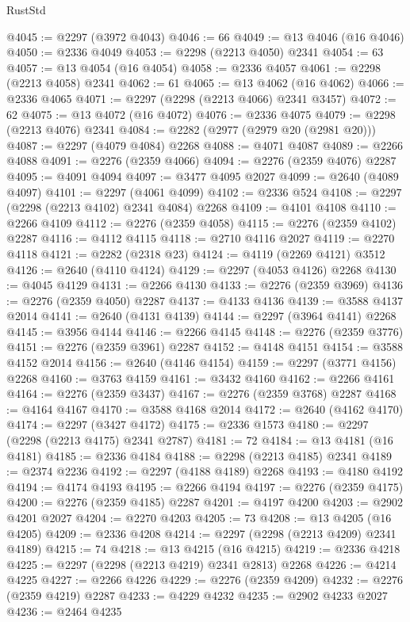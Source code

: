 \begin{lexlean}{RustStd}
\begin{coremodule}
@4045 := @2297 (@3972 @4043)
@4046 := 66
@4049 := @13 @4046 (@16 @4046)
@4050 := @2336 @4049
@4053 := @2298 (@2213 @4050) @2341
@4054 := 63
@4057 := @13 @4054 (@16 @4054)
@4058 := @2336 @4057
@4061 := @2298 (@2213 @4058) @2341
@4062 := 61
@4065 := @13 @4062 (@16 @4062)
@4066 := @2336 @4065
@4071 := @2297 (@2298 (@2213 @4066) @2341 @3457)
@4072 := 62
@4075 := @13 @4072 (@16 @4072)
@4076 := @2336 @4075
@4079 := @2298 (@2213 @4076) @2341
@4084 := @2282 (@2977 (@2979 @20 (@2981 @20)))
@4087 := @2297 (@4079 @4084) @2268
@4088 := @4071 @4087
@4089 := @2266 @4088
@4091 := @2276 (@2359 @4066)
@4094 := @2276 (@2359 @4076) @2287
@4095 := @4091 @4094
@4097 := @3477 @4095 @2027
@4099 := @2640 (@4089 @4097)
@4101 := @2297 (@4061 @4099)
@4102 := @2336 @524
@4108 := @2297 (@2298 (@2213 @4102) @2341 @4084) @2268
@4109 := @4101 @4108
@4110 := @2266 @4109
@4112 := @2276 (@2359 @4058)
@4115 := @2276 (@2359 @4102) @2287
@4116 := @4112 @4115
@4118 := @2710 @4116 @2027
@4119 := @2270 @4118
@4121 := @2282 (@2318 @23)
@4124 := @4119 (@2269 @4121) @3512
@4126 := @2640 (@4110 @4124)
@4129 := @2297 (@4053 @4126) @2268
@4130 := @4045 @4129
@4131 := @2266 @4130
@4133 := @2276 (@2359 @3969)
@4136 := @2276 (@2359 @4050) @2287
@4137 := @4133 @4136
@4139 := @3588 @4137 @2014
@4141 := @2640 (@4131 @4139)
@4144 := @2297 (@3964 @4141) @2268
@4145 := @3956 @4144
@4146 := @2266 @4145
@4148 := @2276 (@2359 @3776)
@4151 := @2276 (@2359 @3961) @2287
@4152 := @4148 @4151
@4154 := @3588 @4152 @2014
@4156 := @2640 (@4146 @4154)
@4159 := @2297 (@3771 @4156) @2268
@4160 := @3763 @4159
@4161 := @3432 @4160
@4162 := @2266 @4161
@4164 := @2276 (@2359 @3437)
@4167 := @2276 (@2359 @3768) @2287
@4168 := @4164 @4167
@4170 := @3588 @4168 @2014
@4172 := @2640 (@4162 @4170)
@4174 := @2297 (@3427 @4172)
@4175 := @2336 @1573
@4180 := @2297 (@2298 (@2213 @4175) @2341 @2787)
@4181 := 72
@4184 := @13 @4181 (@16 @4181)
@4185 := @2336 @4184
@4188 := @2298 (@2213 @4185) @2341
@4189 := @2374 @2236
@4192 := @2297 (@4188 @4189) @2268
@4193 := @4180 @4192
@4194 := @4174 @4193
@4195 := @2266 @4194
@4197 := @2276 (@2359 @4175)
@4200 := @2276 (@2359 @4185) @2287
@4201 := @4197 @4200
@4203 := @2902 @4201 @2027
@4204 := @2270 @4203
@4205 := 73
@4208 := @13 @4205 (@16 @4205)
@4209 := @2336 @4208
@4214 := @2297 (@2298 (@2213 @4209) @2341 @4189)
@4215 := 74
@4218 := @13 @4215 (@16 @4215)
@4219 := @2336 @4218
@4225 := @2297 (@2298 (@2213 @4219) @2341 @2813) @2268
@4226 := @4214 @4225
@4227 := @2266 @4226
@4229 := @2276 (@2359 @4209)
@4232 := @2276 (@2359 @4219) @2287
@4233 := @4229 @4232
@4235 := @2902 @4233 @2027
@4236 := @2464 @4235

\end{coremodule}
\end{lexlean}
